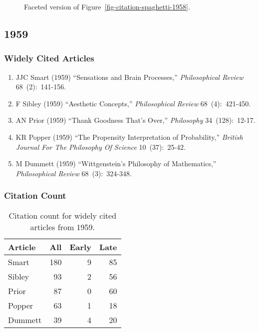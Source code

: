 \documentclass[
  10pt,
  letterpaper,
  DIV=11,
  numbers=noendperiod,
  twoside]{scrartcl}
\providecommand{\tightlist}{%
  \setlength{\itemsep}{0pt}\setlength{\parskip}{0pt}}\usepackage{longtable,booktabs,array}
\begin{document}
\begin{figure}


\caption{\label{fig-citation-facet-1958}Faceted version of
Figure~\ref{fig-citation-spaghetti-1958}.}

\end{figure}%

\newpage

\subsection{1959}\label{sec-s1959}

\subsubsection*{Widely Cited Articles}\label{widely-cited-articles-3}

\begin{enumerate}
\def\labelenumi{\arabic{enumi}.}
\tightlist
\item
  JJC Smart (1959) ``Sensations and Brain Processes,''
  \emph{Philosophical Review} 68~(2):~141-156.
\item
  F Sibley (1959) ``Aesthetic Concepts,'' \emph{Philosophical Review}
  68~(4):~421-450.
\item
  AN Prior (1959) ``Thank Goodness That's Over,'' \emph{Philosophy}
  34~(128):~12-17.
\item
  KR Popper (1959) ``The Propensity Interpretation of Probability,''
  \emph{British Journal For The Philosophy Of Science} 10~(37):~25-42.
\item
  M Dummett (1959) ``Wittgenstein's Philosophy of Mathematics,''
  \emph{Philosophical Review} 68~(3):~324-348.
\end{enumerate}

\subsubsection*{Citation Count}\label{sec-count-1959}

\begin{longtable}[]{@{}lrrr@{}}

\caption{\label{tbl-citation-count-1959}Citation count for widely cited
articles from 1959.}

\tabularnewline

\toprule\noalign{}
Article & All & Early & Late \\
\midrule\noalign{}
\endhead
\bottomrule\noalign{}
\endlastfoot
Smart & 180 & 9 & 85 \\
Sibley & 93 & 2 & 56 \\
Prior & 87 & 0 & 60 \\
Popper & 63 & 1 & 18 \\
Dummett & 39 & 4 & 20 \\

\end{longtable}
\end{document}
